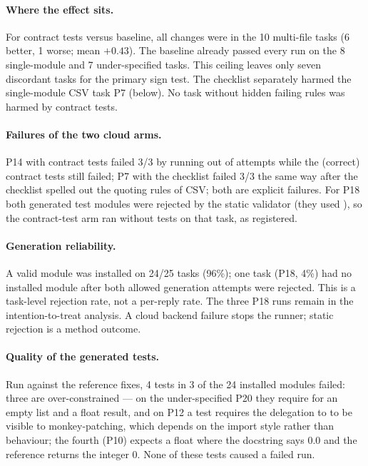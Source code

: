 \documentclass[11pt]{article}
\begin{document}
\paragraph{Where the effect sits.} For contract tests versus baseline, all changes were in the 10 multi-file tasks (6 better, 1 worse; mean $+0.43$). The baseline already passed every run on the 8 single-module and 7 under-specified tasks. This ceiling leaves only seven discordant tasks for the primary sign test. The checklist separately harmed the single-module CSV task P7 (below). No task without hidden failing rules was harmed by contract tests.

\paragraph{Failures of the two cloud arms.} P14 with contract tests failed 3/3 by running out of attempts while the (correct) contract tests still failed; P7 with the checklist failed 3/3 the same way after the checklist spelled out the quoting rules of CSV; both are explicit failures. For P18 both generated test modules were rejected by the static validator (they used ), so the contract-test arm ran without tests on that task, as registered.

\paragraph{Generation reliability.} A valid module was installed on 24/25 tasks (96\%); one task (P18, 4\%) had no installed module after both allowed generation attempts were rejected. This is a task-level rejection rate, not a per-reply rate. The three P18 runs remain in the intention-to-treat analysis. A cloud backend failure stops the runner; static rejection is a method outcome.

\paragraph{Quality of the generated tests.} Run against the reference fixes, 4 tests in 3 of the 24 installed modules failed: three are over-constrained --- on the under-specified P20 they require  for an empty list and a float result, and on P12 a test requires the delegation to  to be visible to monkey-patching, which depends on the import style rather than behaviour; the fourth (P10) expects a float  where the docstring says 0.0 and the reference returns the integer 0. None of these tests caused a failed run.
\end{document}
